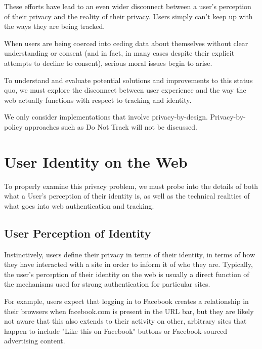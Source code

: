 \documentclass[letterpaper,11pt]{llncs}
\begin{document}
These efforts have lead to an even wider disconnect between a user's
perception of their privacy and the reality of their privacy. Users simply
can't keep up with the ways they are being tracked.

When users are being coerced into ceding data about themselves without clear
understanding or consent (and in fact, in many cases despite their explicit
attempts to decline to consent), serious moral issues begin to arise.

To understand and evaluate potential solutions and improvements to this status
quo, we must explore the disconnect between user experience and the way the
web actually functions with respect to tracking and identity.


We only consider implementations that involve privacy-by-design.
Privacy-by-policy approaches such as Do Not Track will not be discussed.

\section{User Identity on the Web}

To properly examine this privacy problem, we must probe into the details of
both what a User's perception of their identity is, as well as the technical
realities of what goes into web authentication and tracking.

\subsection{User Perception of Identity}

Instinctively, users define their privacy in terms of their identity, in terms
of how they have interacted with a site in order to inform it of who they are.
Typically, the user's perception of their identity on the web is usually a direct
function of the mechanisms used for strong authentication for particular sites.

For example, users expect that logging in to Facebook creates a relationship
in their browsers when facebook.com is present in the URL bar, but they are
likely not aware that this also extends to their activity on other, arbitrary
sites that happen to include "Like this on Facebook" buttons or
Facebook-sourced advertising content.
\end{document}
